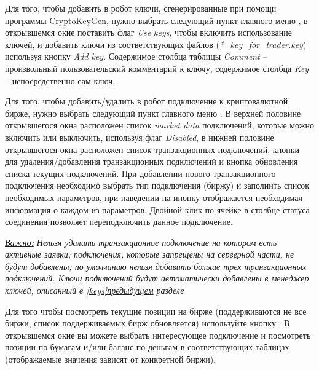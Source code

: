 \label{keys}

Для того, чтобы добавить в робот ключи, сгенерированные при помощи программы \href{http://fkviking.ru/downloads/index.php?get=CryptoKeyGen}{CryptoKeyGen}, нужно выбрать следующий 
пункт главного меню , в открывшемся окне поставить флаг \textit{Use keys}, чтобы включить использование ключей, и
добавить ключи из соответствующих файлов (\textit{*\_key\_for\_trader.key}) используя кнопку \textit{Add key}. Содержимое столбца таблицы \textit{Comment} -- произвольный пользовательский
комментарий к ключу, содержимое столбца \textit{Key} -- непосредственно сам ключ.

\label{manageconns}

Для того, чтобы добавить/удалить в робот подключение к криптовалютной бирже, нужно выбрать следующий 
пункт главного меню . В верхней половине открывшегося окна расположен список \textit{market data} подключений, которые можно
включить или выключить, используя флаг \textit{Disabled}, в нижней половине открывшегося окна расположен список транзакционных подключений, кнопки для удаления/добавления
транзакционных подключений и кнопка обновления списка текущих подключений. При добавлении нового транзакционного подключения необходимо выбрать тип подключения (биржу)
и заполнить список необходимых параметров, при наведении на инонку  отображается необходимая информация о каждом из параметров.
Двойной клик по ячейке в столбце статуса соединения позволяет переподключить данное подключение.\newline

\noindent\textit{\underline{Важно:} Нельзя удалить транзакционное подключение на котором есть активные заявки; подключения, которые запрещены на серверной части,
не будут добавлены; по умолчанию нельзя добавить больше трех транзакционных подключений. Ключи подключений будут автоматически добавлены в менеджер ключей,
описанный в \hyperref[keys]{\ref{keys}предыдущем} разделе}

\label{positions}

Для того чтобы посмотреть текущие позиции на бирже (поддерживаются не все биржи, список поддерживаемых бирж обновляется) используйте кнопку . В открывшемся окне вы можете выбрать
интересующее подключение и посмотреть позиции по бумагам и/или баланс по деньгам в соответствующих таблицах (отображаемые значения зависят от конкретной биржи).\newline


